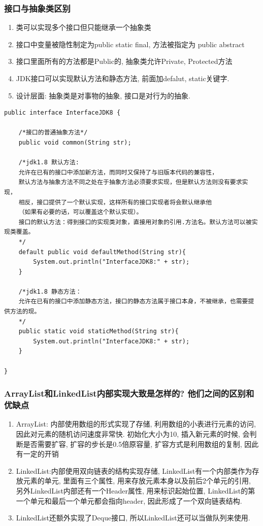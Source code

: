 \documentclass[UTF8]{ctexart}
\begin{document}
\subsubsection{接口与抽象类区别}
\begin{enumerate}
	\item 类可以实现多个接口但只能继承一个抽象类
	\item 接口中变量被隐性制定为public static final, 方法被指定为 public abstract
	\item 接口里面所有的方法都是Public的, 抽象类允许Private, Protected方法
	\item JDK接口可以实现默认方法和静态方法, 前面加defalut, static关键字.
	\item 设计层面: 抽象类是对事物的抽象, 接口是对行为的抽象.
\end{enumerate}
\begin{lstlisting}
public interface InterfaceJDK8 {
	
	/*接口的普通抽象方法*/
	public void common(String str);
	
	/*jdk1.8 默认方法:
	允许在已有的接口中添加新方法，而同时又保持了与旧版本代码的兼容性，
	默认方法与抽象方法不同之处在于抽象方法必须要求实现，但是默认方法则没有要求实现，
	相反，接口提供了一个默认实现，这样所有的接口实现者将会默认继承他
	（如果有必要的话，可以覆盖这个默认实现）。
	接口的默认方法：得到接口的实现类对象，直接用对象的引用.方法名。默认方法可以被实现类覆盖。
	*/
	default public void defaultMethod(String str){
		System.out.println("InterfaceJDK8:" + str);
	}
	
	/*jdk1.8 静态方法：
	允许在已有的接口中添加静态方法，接口的静态方法属于接口本身，不被继承，也需要提供方法的现。
	*/
	public static void staticMethod(String str){
		System.out.println("InterfaceJDK8:" + str);
	}
	
}
\end{lstlisting}
\subsubsection{ArrayList和LinkedList内部实现大致是怎样的? 他们之间的区别和优缺点}
\begin{enumerate}
	\item ArrayList: 内部使用数组的形式实现了存储, 利用数组的小表进行元素的访问, 因此对元素的随机访问速度非常快. 初始化大小为10, 插入新元素的时候, 会判断是否需要扩容, 扩容的步长是0.5倍原容量, 扩容方式是利用数组的复制, 因此有一定的开销
	\item LinkedList:内部使用双向链表的结构实现存储, LinkedList有一个内部类作为存放元素的单元, 里面有三个属性, 用来存放元素本身以及前后2个单元的引用, 另外LinkedList内部还有一个Header属性, 用来标识起始位置, LinkedList的第一个单元和最后一个单元都会指向header, 因此形成了一个双向链表结构.
	\item LinkedList还额外实现了Deque接口, 所以LinkedList还可以当做队列来使用. \par
\end{enumerate}
\end{document}
